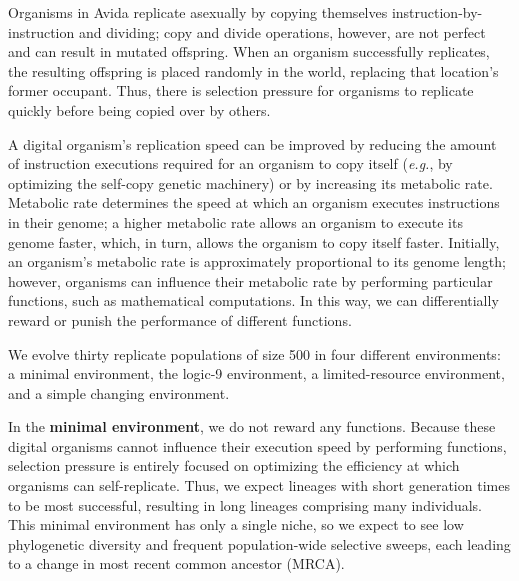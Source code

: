 \documentclass[letterpaper]{article}
\begin{document}
Organisms in Avida replicate asexually by copying themselves instruction-by-instruction and dividing; copy and divide operations, however, are not perfect and can result in mutated offspring.
When an organism successfully replicates, the resulting offspring is placed randomly in the world, replacing that location's former occupant.
Thus, there is selection pressure for organisms to replicate quickly before being copied over by others.

A digital organism's replication speed can be improved by reducing the amount of instruction executions required for an organism to copy itself (\textit{e.g.}, by optimizing the self-copy genetic machinery) or by increasing its metabolic rate. Metabolic rate determines the speed at which an organism executes instructions in their genome; a higher metabolic rate allows an organism to execute its genome faster, which, in turn, allows the organism to copy itself faster. 
Initially, an organism's metabolic rate is approximately proportional
to its genome length; however, organisms can influence their metabolic rate by performing particular functions, such as mathematical computations.
In this way, we can differentially reward or punish the performance of different functions.

We evolve thirty replicate populations of size 500 in four different environments: a minimal environment, the logic-9 environment, a limited-resource environment, and a simple changing environment. %


In the \textbf{minimal environment}, we do not reward any functions. Because these digital organisms cannot influence their execution speed by performing functions, selection pressure is entirely focused on optimizing the efficiency at which organisms can self-replicate. 
Thus, we expect lineages with short generation times to be most successful, resulting in long lineages comprising many individuals. This minimal environment has only a single niche, so we expect to see low phylogenetic diversity and frequent population-wide selective sweeps, each leading to a change in most recent common ancestor (MRCA).
\end{document}

